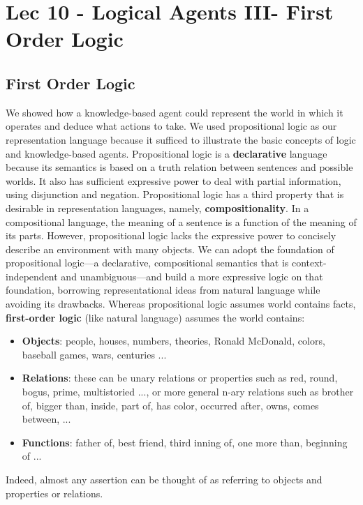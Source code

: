 \chapter{Lec 10 - Logical Agents III- First Order Logic}
\section{First Order Logic}
We showed how a knowledge-based agent could represent the world in which it operates and deduce what actions to take. We used propositional logic as our representation language because it sufficed to illustrate the basic concepts of logic and knowledge-based agents. Propositional logic is a \textbf{declarative} language because its semantics is based on a truth relation between sentences and possible worlds. It also has sufficient expressive power to deal with partial information, using disjunction and negation. Propositional logic has a third property that is desirable in representation languages, namely, \textbf{compositionality}. In a compositional language, the meaning of a sentence is a function of the meaning of its parts. However, propositional logic lacks the expressive power to concisely describe an environment with many objects.\newline\newline
We can adopt the foundation of propositional logic—a declarative, compositional semantics that is context-independent and unambiguous—and build a more expressive logic on that foundation, borrowing representational ideas from natural language while avoiding its drawbacks. Whereas propositional logic assumes world contains facts, \textbf{first-order logic} (like natural language) assumes the world contains:
\begin{itemize}
    \item \textbf{Objects}: people, houses, numbers, theories, Ronald McDonald, colors, baseball games, wars, centuries ...

    \item \textbf{Relations}: these can be unary relations or properties such as red, round, bogus, prime, multistoried ..., or more general n-ary relations such as brother of, bigger than, inside, part of, has color, occurred after, owns, comes between, ...

    \item \textbf{Functions}: father of, best friend, third inning of, one more than, beginning of ...
\end{itemize}
Indeed, almost any assertion can be thought of as referring to objects and properties or relations.


